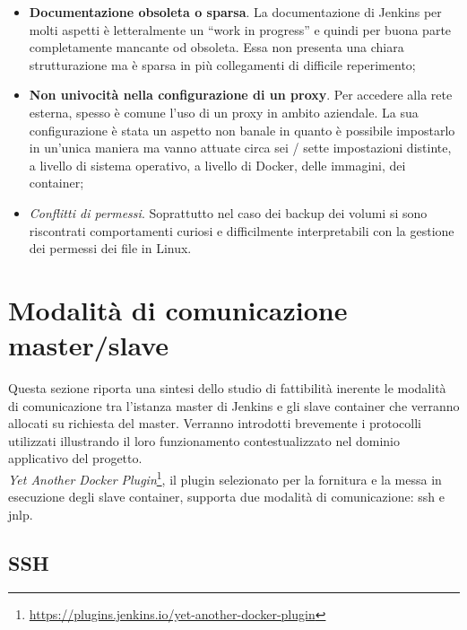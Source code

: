 \begin{itemize}
    \item \textbf{Documentazione obsoleta o sparsa}. La documentazione di Jenkins per molti aspetti è letteralmente un ``work in progress'' e quindi per buona parte completamente mancante od obsoleta. Essa non presenta una chiara strutturazione ma è sparsa in più collegamenti di difficile reperimento;
    \item \textbf{Non univocità nella configurazione di un proxy}. Per accedere alla rete esterna, spesso è comune l'uso di un proxy in ambito aziendale. La sua configurazione è stata un aspetto non banale in quanto è possibile impostarlo in un'unica maniera ma vanno attuate circa sei / sette impostazioni distinte, a livello di sistema operativo, a livello di Docker, delle immagini, dei container;
    \item \textit{Conflitti di permessi}\cite{site:understanding-permissions-in-docker}. Soprattutto nel caso dei backup dei volumi\cite{site:understanding-docker-volumes} si sono riscontrati comportamenti curiosi e difficilmente interpretabili con la gestione dei permessi dei file in \gls{Linux}. 
\end{itemize}

\section{Modalità di comunicazione master/slave}

Questa sezione riporta una sintesi dello studio di fattibilità inerente le modalità di comunicazione tra l'istanza \gls{master} di Jenkins e gli \gls{slave} \gls{container} che verranno allocati su richiesta del master\cite{site:jenkins-distributed-builds}. Verranno introdotti brevemente i protocolli utilizzati illustrando il loro funzionamento contestualizzato nel dominio applicativo del progetto. \\

\textit{Yet Another Docker Plugin}\footnote{\url{https://plugins.jenkins.io/yet-another-docker-plugin}}, il \gls{plugin} selezionato per la fornitura e la messa in esecuzione degli slave container, supporta due modalità di comunicazione: \gls{ssh} e \gls{jnlp}.  

\subsection{SSH}
\label{subsec:ssh}

